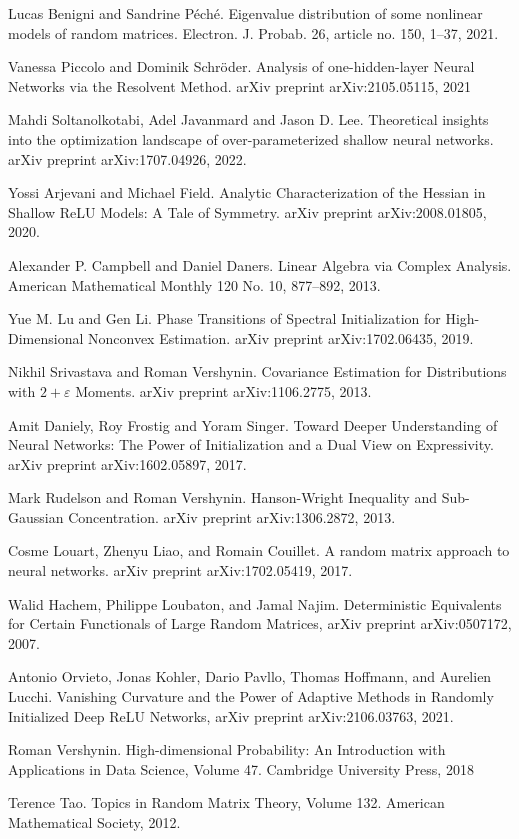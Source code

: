 \documentclass{article}
\begin{document}
\begin{thebibliography}{9}
Lucas Benigni and Sandrine Péché. Eigenvalue distribution of some nonlinear models of random matrices. Electron. J. Probab. 26, article no. 150, 1–37, 2021.

Vanessa Piccolo and Dominik Schröder. Analysis of one-hidden-layer Neural Networks via the Resolvent Method. arXiv preprint arXiv:2105.05115, 2021

Mahdi Soltanolkotabi, Adel Javanmard and Jason D. Lee. Theoretical insights into the optimization landscape of over-parameterized shallow neural networks. arXiv preprint arXiv:1707.04926, 2022.

Yossi Arjevani and Michael Field. Analytic Characterization of the Hessian
in Shallow ReLU Models: A Tale of Symmetry. arXiv preprint arXiv:2008.01805, 2020.

Alexander P. Campbell and Daniel Daners. Linear Algebra via Complex Analysis. American Mathematical Monthly 120 No. 10,
877–892, 2013.

Yue M. Lu and Gen Li. Phase Transitions of Spectral Initialization for High-Dimensional Nonconvex Estimation. arXiv preprint arXiv:1702.06435, 2019.

Nikhil Srivastava and Roman Vershynin. Covariance Estimation for Distributions with $2+\varepsilon$ Moments. arXiv preprint arXiv:1106.2775, 2013.

Amit Daniely, Roy Frostig and Yoram Singer. Toward Deeper Understanding of Neural Networks: The Power of Initialization and a Dual View on Expressivity. arXiv preprint arXiv:1602.05897, 2017.

Mark Rudelson and Roman Vershynin. Hanson-Wright Inequality and Sub-Gaussian Concentration. arXiv preprint arXiv:1306.2872, 2013.

Cosme Louart, Zhenyu Liao, and Romain Couillet. A random matrix approach to neural networks. arXiv preprint arXiv:1702.05419, 2017.

Walid Hachem, Philippe Loubaton, and Jamal Najim. Deterministic Equivalents for Certain Functionals
of Large Random Matrices, arXiv preprint arXiv:0507172, 2007.

Antonio Orvieto, Jonas Kohler, Dario Pavllo, Thomas Hoffmann, and Aurelien Lucchi. Vanishing Curvature and the Power of Adaptive Methods in Randomly Initialized Deep ReLU Networks, arXiv preprint arXiv:2106.03763, 2021.

Roman Vershynin. High-dimensional Probability: An Introduction with Applications in Data Science, Volume 47. Cambridge University
Press, 2018

Terence Tao. Topics in Random Matrix Theory, Volume 132. American Mathematical Society, 2012.

\end{thebibliography}
\end{document}
